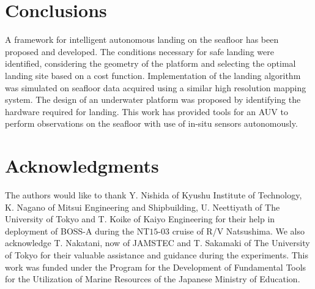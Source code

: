 \section{Conclusions}

A framework for intelligent autonomous landing on the seafloor has been proposed and developed. The conditions necessary for safe landing were identified, considering the geometry of the platform and selecting the optimal landing site based on a cost function. Implementation of the landing algorithm was simulated on seafloor data acquired using a similar high resolution mapping system. The design of an underwater platform was proposed by identifying the hardware required for landing. This work has provided tools for an AUV to perform observations on the seafloor with use of in-situ sensors autonomously. 


\section*{Acknowledgments}

The authors would like to thank Y. Nishida of Kyushu Institute of Technology, K. Nagano of Mitsui Engineering and Shipbuilding, U. Neettiyath of The University of Tokyo and T. Koike of Kaiyo Engineering for their help in deployment of BOSS-A during the NT$15$-$03$ cruise of R/V Natsushima. We also acknowledge T. Nakatani, now of JAMSTEC and T. Sakamaki of The University of Tokyo for their valuable assistance and guidance during the experiments. This work was funded under the Program for the Development of Fundamental Tools for the Utilization of Marine Resources of the Japanese Ministry of Education.
